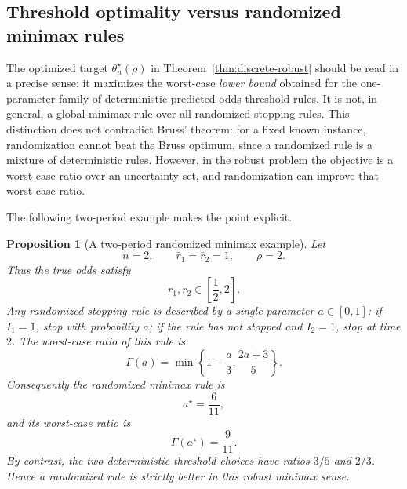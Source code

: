 \documentclass[11pt,a4paper]{article}
\newtheorem{proposition}{Proposition}
\begin{document}
\subsection{Threshold optimality versus randomized minimax rules}

The optimized target \(\theta_n^\star(\rho)\) in
Theorem~\ref{thm:discrete-robust} should be read in a precise sense: it
maximizes the worst-case \emph{lower bound} obtained for the one-parameter
family of deterministic predicted-odds threshold rules.  It is not, in general,
a global minimax rule over all randomized stopping rules.  This distinction does
not contradict Bruss' theorem: for a fixed known instance, randomization cannot
beat the Bruss optimum, since a randomized rule is a mixture of deterministic
rules.  However, in the robust problem the objective is a worst-case ratio over
an uncertainty set, and randomization can improve that worst-case ratio.

The following two-period example makes the point explicit.

\begin{proposition}[A two-period randomized minimax example]
\label{prop:n2-randomized}
Let
\[
  n=2,
  \qquad
  \bar r_1=\bar r_2=1,
  \qquad
  \rho=2.
\]
Thus the true odds satisfy
\[
  r_1,r_2\in\left[\frac12,2\right].
\]
Any randomized stopping rule is described by a single parameter
\(a\in[0,1]\): if \(I_1=1\), stop with probability \(a\); if the rule has not
stopped and \(I_2=1\), stop at time \(2\).  The worst-case ratio of this rule is
\[
  \Gamma(a)
  =
  \min\left\{1-\frac a3,\frac{2a+3}{5}\right\}.
\]
Consequently the randomized minimax rule is
\[
  \boxed{a^\star=\frac6{11}},
\]
and its worst-case ratio is
\[
  \boxed{\Gamma(a^\star)=\frac9{11}}.
\]
By contrast, the two deterministic threshold choices have ratios \(3/5\) and
\(2/3\).  Hence a randomized rule is strictly better in this robust minimax
sense.
\end{proposition}
\end{document}

